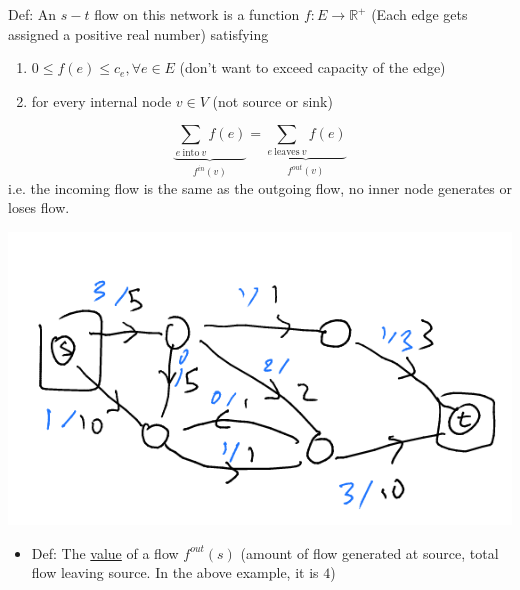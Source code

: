 \documentclass[11pt]{article}
\begin{document}
Def: An \(s-t\) flow on this network is a function \(f: E \to \mathbb{R}^{+}\) (Each edge gets assigned a positive real number) satisfying
\begin{enumerate}
\item\relax [capacity] \(0 \leq f(e) \leq c_e, \forall e \in E\) (don't want to exceed capacity of the edge)
\item{} for every internal node \(v\in V\) (not source or sink)
\end{enumerate}
$$ \underbrace{\sum_{e \ \text{into} \ v}f(e)}_{f^{in}(v)} = \underbrace{\sum_{e \ \text{leaves} \ v}f(e)}_{f^{out}(v)}$$
i.e. the incoming flow is the same as the outgoing flow, no inner node generates or loses flow.
\begin{center}
\includegraphics[width=.9\linewidth]{./Images/i105.png}
\end{center}
\begin{itemize}
\item Def: The \uline{value} of a flow \(f^{out}(s)\) (amount of flow generated at source, total flow leaving source. In the above example, it is \(4\))
\end{itemize}
\end{document}

